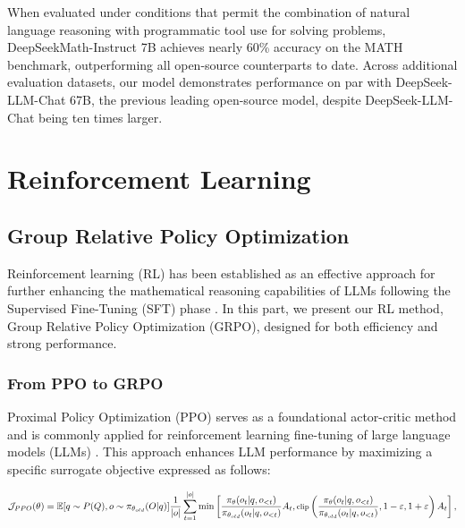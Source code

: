 \begin{itemize}[topsep=0pt]
When evaluated under conditions that permit the combination of natural language reasoning with programmatic tool use for solving problems, DeepSeekMath-Instruct 7B achieves nearly 60\% accuracy on the MATH benchmark, outperforming all open-source counterparts to date. Across additional evaluation datasets, our model demonstrates performance on par with DeepSeek-LLM-Chat 67B, the previous leading open-source model, despite DeepSeek-LLM-Chat being ten times larger.

\section{Reinforcement Learning}

\subsection{Group Relative Policy Optimization}
Reinforcement learning (RL) has been established as an effective approach for further enhancing the mathematical reasoning capabilities of LLMs following the Supervised Fine-Tuning (SFT) phase \citep{wang2023math,wizardmath}. In this part, we present our RL method, Group Relative Policy Optimization (GRPO), designed for both efficiency and strong performance.

\subsubsection{From PPO to GRPO} Proximal Policy Optimization (PPO) \citep{schulman2017proximal} serves as a foundational actor-critic method and is commonly applied for reinforcement learning fine-tuning of large language models (LLMs) \citep{ouyang2022training}. This approach enhances LLM performance by maximizing a specific surrogate objective expressed as follows:

\begin{equation}
\footnotesize
    \mathcal{J}_{PPO}(\theta) = \mathbb{E}{[q \sim P(Q), o \sim \pi_{\theta_{old}}(O|q)]} \frac{1}{|o|} \sum_{t=1}^{|o|} \min \left[ \frac{\pi_\theta(o_{t} | q, o_{<t})}{\pi_{\theta_{old}}(o_{t} | q, o_{<t})} A_{t}, \text{clip} \left( \frac{\pi_\theta(o_{t} | q, o_{<t})}{\pi_{\theta_{old}}(o_{t} | q, o_{<t})}, 1 - \varepsilon, 1 + \varepsilon \right)  A_{t} \right] ,
\end{equation}


\end{itemize}
